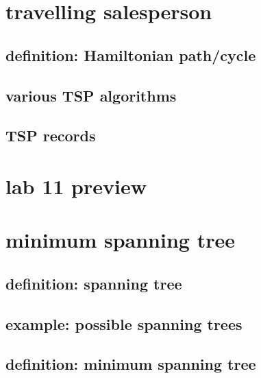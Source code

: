 

\section{travelling salesperson}



\subsection{definition: Hamiltonian path/cycle}



\subsection{various TSP algorithms}



\subsection{TSP records}



\section{lab 11 preview}



\section{minimum spanning tree}

\subsection{definition: spanning tree}



\subsection{example: possible spanning trees}




\subsection{definition: minimum spanning tree}

